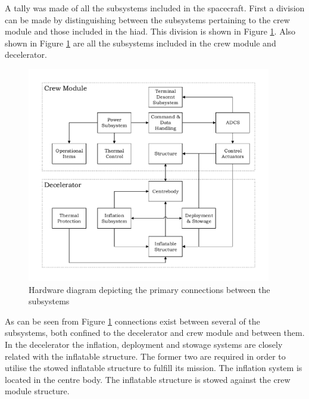 A tally was made of all the subsystems included in the spacecraft. First a division can be made by distinguishing between the subsystems pertaining to the crew module and those included in the \gls{hiad}. This division is shown in Figure \ref{fig:subsystems}. Also shown in Figure \ref{fig:subsystems} are all the subsystems included in the crew module and decelerator.
\begin{figure}[h]
	\includegraphics[width=0.95\textwidth]{./Figure/subsystem_breakdown/hardware_structure.pdf}
	\caption{Hardware diagram depicting the primary connections between the subsystems}
	\label{fig:subsystems} 
\end{figure}
%
%
%
%
%
%

As can be seen from Figure \ref{fig:subsystems} connections exist between several of the subsystems, both confined to the decelerator and crew module and between them. In the decelerator the inflation, deployment and stowage systems are closely related with the inflatable structure. The former two are required in order to utilise the stowed inflatable structure to fulfill its mission. The inflation system is located in the centre body. The inflatable structure is stowed against the crew module structure.

